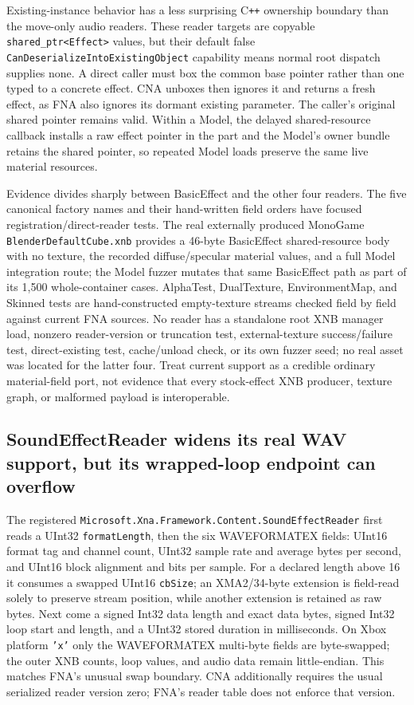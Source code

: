 Existing-instance behavior has a less surprising C\texttt{++} ownership boundary than the
move-only audio readers.  These reader targets are copyable \texttt{shared\_ptr<Effect>} values,
but their default false \texttt{CanDeserializeIntoExistingObject} capability means normal root
dispatch supplies none.  A direct caller must box the common base pointer rather than one typed
to a concrete effect.  CNA unboxes then ignores it and returns a fresh effect, as FNA also ignores
its dormant existing parameter.  The caller's original shared pointer remains
valid.  Within a Model, the delayed shared-resource callback installs a raw effect pointer in the
part and the Model's owner bundle retains the shared pointer, so repeated Model loads preserve the
same live material resources.

Evidence divides sharply between BasicEffect and the other four readers.  The five canonical
factory names and their hand-written field orders have focused registration/direct-reader tests.
The real externally produced MonoGame \texttt{BlenderDefaultCube.xnb} provides a 46-byte
BasicEffect shared-resource body with no texture, the recorded diffuse/specular material values,
and a full Model integration route; the Model fuzzer mutates that same BasicEffect path as part of
its 1,500 whole-container cases.  AlphaTest, DualTexture, EnvironmentMap, and Skinned tests are
hand-constructed empty-texture streams checked field by field against current FNA sources.  No
reader has a standalone root XNB manager load, nonzero reader-version or truncation test,
external-texture success/failure test, direct-existing test, cache/unload check, or its own
fuzzer seed; no real asset was located for the latter four.  Treat current support as a credible
ordinary material-field port, not evidence that every stock-effect XNB producer, texture graph,
or malformed payload is interoperable.

\subsection{SoundEffectReader widens its real WAV support, but its wrapped-loop endpoint can overflow}
\label{sec:xnb-soundeffect-reader-contract}

The registered \texttt{Microsoft.Xna.Framework.Content.SoundEffectReader} first reads a UInt32
\texttt{formatLength}, then the six WAVEFORMATEX fields: UInt16 format tag and channel count,
UInt32 sample rate and average bytes per second, and UInt16 block alignment and bits per sample.
For a declared length above 16 it consumes a swapped UInt16 \texttt{cbSize}; an XMA2/34-byte
extension is field-read solely to preserve stream position, while another extension is retained
as raw bytes. Next come a signed Int32 data length and exact data bytes, signed Int32 loop start
and length, and a UInt32 stored duration in milliseconds. On Xbox platform \texttt{'x'} only the
WAVEFORMATEX multi-byte fields are byte-swapped; the outer XNB counts, loop values, and audio data
remain little-endian. This matches FNA's unusual swap boundary. CNA additionally requires the
usual serialized reader version zero; FNA's reader table does not enforce that version.

